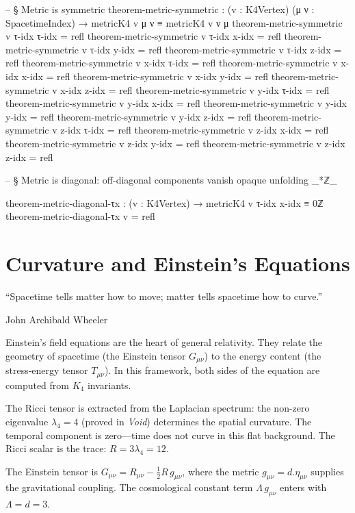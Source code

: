 \documentclass[11pt,a4paper]{book}
\def\cdot{.}%
\begin{document}
\begin{code}
-- § Metric is symmetric
theorem-metric-symmetric : (v : K4Vertex) (μ ν : SpacetimeIndex) →
  metricK4 v μ ν ≡ metricK4 v ν μ
theorem-metric-symmetric v τ-idx τ-idx = refl
theorem-metric-symmetric v τ-idx x-idx = refl
theorem-metric-symmetric v τ-idx y-idx = refl
theorem-metric-symmetric v τ-idx z-idx = refl
theorem-metric-symmetric v x-idx τ-idx = refl
theorem-metric-symmetric v x-idx x-idx = refl
theorem-metric-symmetric v x-idx y-idx = refl
theorem-metric-symmetric v x-idx z-idx = refl
theorem-metric-symmetric v y-idx τ-idx = refl
theorem-metric-symmetric v y-idx x-idx = refl
theorem-metric-symmetric v y-idx y-idx = refl
theorem-metric-symmetric v y-idx z-idx = refl
theorem-metric-symmetric v z-idx τ-idx = refl
theorem-metric-symmetric v z-idx x-idx = refl
theorem-metric-symmetric v z-idx y-idx = refl
theorem-metric-symmetric v z-idx z-idx = refl

-- § Metric is diagonal: off-diagonal components vanish
opaque
  unfolding _*ℤ_

  theorem-metric-diagonal-τx : (v : K4Vertex) → metricK4 v τ-idx x-idx ≡ 0ℤ
  theorem-metric-diagonal-τx v = refl
\end{code}

\chapter{Curvature and Einstein's Equations}
\label{ch:einstein-equations}

\epigraph{``Spacetime tells matter how to move; matter tells spacetime how to curve.''}{John Archibald Wheeler}

Einstein's field equations are the heart of general relativity. They relate the geometry of spacetime (the Einstein tensor $G_{\mu\nu}$) to the energy content (the stress-energy tensor $T_{\mu\nu}$). In this framework, both sides of the equation are computed from $K_4$ invariants.

The Ricci tensor is extracted from the Laplacian spectrum: the non-zero eigenvalue $\lambda_4 = 4$ (proved in \textit{Void}) determines the spatial curvature. The temporal component is zero---time does not curve in this flat background. The Ricci scalar is the trace: $R = 3\lambda_4 = 12$.

The Einstein tensor is $G_{\mu\nu} = R_{\mu\nu} - \frac{1}{2}R\,g_{\mu\nu}$, where the metric $g_{\mu\nu} = d \cdot \eta_{\mu\nu}$ supplies the gravitational coupling. The cosmological constant term $\Lambda\,g_{\mu\nu}$ enters with $\Lambda = d = 3$.
\end{document}
